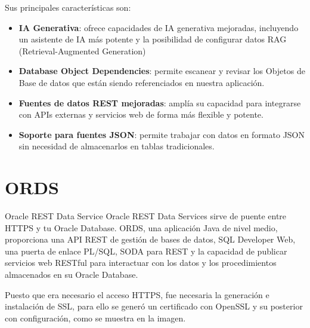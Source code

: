 Sus principales características son:
\begin{itemize}
	\item \textbf{IA Generativa}: ofrece capacidades de IA generativa mejoradas, incluyendo un asistente de IA más potente y la posibilidad de configurar datos RAG (Retrieval-Augmented Generation)
	\item \textbf{Database Object Dependencies}: permite escanear y revisar los Objetos de Base de datos que están siendo referenciados en nuestra aplicación.
	\item \textbf{Fuentes de datos REST mejoradas}: amplía su capacidad para integrarse con APIs externas y servicios web de forma más flexible y potente.
	\item \textbf{Soporte para fuentes JSON}: permite trabajar con datos en formato JSON sin necesidad de almacenarlos en tablas tradicionales.
	
\end{itemize}

\section{\acrshort{ORDS}}
Oracle \acrshort{REST} Data Service Oracle REST Data Services sirve de puente entre \acrshort{HTTPS} y tu Oracle Database. ORDS, una aplicación Java de nivel medio, proporciona una API REST de gestión de bases de datos, SQL Developer Web, una puerta de enlace PL/SQL, SODA para REST y la capacidad de publicar servicios web RESTful para interactuar con los datos y los procedimientos almacenados en su Oracle Database.

Puesto que era necesario el acceso \acrshort{HTTPS}, fue necesaria la generación e instalación de \acrshort{SSL}, para ello se generó un certificado con OpenSSL y su posterior con configuración, como se muestra en la imagen.

